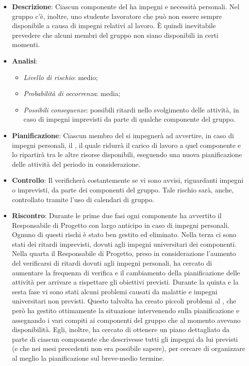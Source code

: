 			\begin{itemize}
				\item \textbf{Descrizione}: Ciascun componente del  ha impegni e necessità personali. Nel gruppo c'è, inoltre, uno studente lavoratore che può non essere sempre disponibile a causa di impegni relativi al lavoro. È quindi inevitabile prevedere che alcuni membri del gruppo non siano disponibili in certi momenti.
				\item \textbf{Analisi}:
				\begin{itemize}
					\item \textit{Livello di rischio}: medio;
					\item \textit{Probabilità di occorrenza}: media;
					\item \textit{Possibili conseguenze}: possibili ritardi nello svolgimento delle attività, in caso di impegni imprevisti da parte di qualche componente del gruppo.
				\end{itemize}
				\item \textbf{Pianificazione}: Ciascun membro del  si impegnerà ad avvertire, in caso di impegni personali, il , il quale ridurrà il carico di lavoro a quel componente e lo ripartirà tra le altre risorse disponibili, eseguendo una nuova pianificazione delle attività del periodo in considerazione.
				\item \textbf{Controllo}: Il  verificherà costantemente se vi sono avvisi, riguardanti impegni o imprevisti, da parte dei componenti del gruppo. Tale rischio sarà, anche, controllato tramite l'uso di calendari di gruppo.
				\item \textbf{Riscontro}: Durante le prime due fasi ogni componente ha avvertito il Responsabile di Progetto con largo anticipo in caso di impegni personali. Ognuno di questi rischi è stato ben gestito ed eliminato. Nella terza  ci sono stati dei ritardi imprevisti, dovuti agli impegni universitari dei componenti. Nella quarta  il Responsabile di Progetto, preso in considerazione l’aumento del verificarsi di ritardi dovuti agli impegni personali, ha cercato di aumentare la frequenza di verifica e il cambiamento della pianificazione delle attività per arrivare a rispettare gli obiettivi previsti. Durante la quinta e la sesta fase vi sono stati alcuni problemi causati da malattie e impegni universitari non previsti. Questo talvolta ha creato piccoli problemi al , che però ha gestito ottimamente la situazione intervenendo sulla pianificazione e assegnando i vari compiti ai componenti del gruppo che al momento avevano disponibilità. Egli, inoltre, ha cercato di ottenere un piano dettagliato da parte di ciascun componente che descrivesse tutti gli impegni da lui previsti (e che nei mesi precedenti non era possibile sapere), per cercare di organizzare al meglio la pianificazione sul breve-medio termine.
			\end{itemize}
